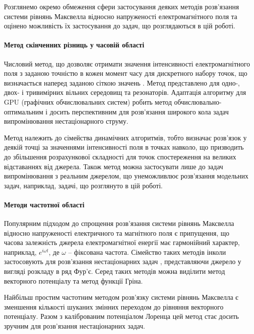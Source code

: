 Розглянемо окремо обмеження сфери застосування деяких методів 
розв'язання системи рівнянь Максвелла відносно напруженості 
електромагнітного поля та оцінено можливість їх застосування до задач, 
що розглядаються в цій роботі.

\paragraph{Метод скінченних різниць у часовій області}

Числовий метод, що дозволяє отримати значення інтенсивності електромагнітного 
поля з заданою точністю в кожен момент часу для дискретного набору точок, що
визначається наперед заданою сіткою значень \cite{imp:FDTD1966}. Метод 
представлено для одно-, двох- і тривимірних \cite{imp:FDTD1975} вільних 
середовищ та резонаторів. Адаптація алгоритму для GPU (графічних 
обчислювальних систем) \cite{imp:FDTD2011} робить метод 
обчислювально-оптимальним і досить перспективним для розв'язання 
широкого кола задач випромінювання нестаціонарного струму.

Метод належить до сімейства динамічних алгоритмів, тобто визначає розв'язок 
у деякій точці за значеннями інтенсивності поля в точках навколо, що 
призводить до збільшення розрахункової складності для точок спостереження на 
великих відставаннях від джерела. Також метод можна застосувати лише до 
задач випромінювання з реальним джерелом, що унеможливлює розв'язання 
модельних задач, наприклад, задачі, що розглянуто в цій роботі.

\paragraph{Методи частотної області}

Популярним підходом до спрощення розв'язання системи рівнянь Максвелла відносно
напруженості електричного та магнітного поля є припущення, що часова залежність 
джерела електромагнітної енергії має гармонійний характер, наприклад, 
$ e^{i \omega t} $, де $ \omega $ -- фіксована частота. Сімейство таких 
методів \cite{imp:Shubarin1960} інколи застосовують для розв'язання 
нестаціонарних задач \cite{imp:Harmuth1981}, представляючи джерело у вигляді 
розкладу в ряд Фур'є. Серед таких методів можна виділити метод векторного 
потенціалу та метод функції Гріна.

Найбільш простим частотним методом розв'язку системи рівнянь Максвелла є 
зменшення кількості шуканих змінних переходом до рівняння векторного 
потенціалу. Разом з каліброваним потенціалом Лоренца цей метод стає досить 
зручним для розв'язання нестаціонарних задач.

